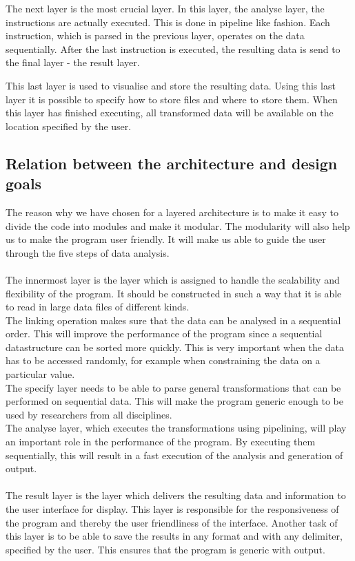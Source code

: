 \documentclass[a4paper,english,fleqn]{exam}
\begin{document}
The next layer is the most crucial layer. In this layer, the analyse layer, the instructions are actually executed. This is done in pipeline like fashion. Each instruction, which is parsed in the previous layer, operates on the data sequentially. After the last instruction is executed, the resulting data is send to the final layer - the result layer. 

This last layer is used to visualise and store the resulting data. Using this last layer it is possible to specify how to store files and where to store them. When this layer has finished executing, all transformed data will be available on the location specified by the user.

\subsection{Relation between the architecture and design goals}
The reason why we have chosen for a layered architecture is to make it easy to divide the code into modules and make it modular. The modularity will also help us to make the program user friendly. It will make us able to guide the user through the five steps of data analysis. \\ \\
The innermost layer is the layer which is assigned to handle the scalability and flexibility of the program. It should be constructed in such a way that it is able to read in large data files of different kinds. \\
The linking operation makes sure that the data can be analysed in a sequential order. This will improve the performance of the program since a sequential datastructure can be sorted more quickly. This is very important when the data has to be accessed randomly, for example when constraining the data on a particular value. 
\\
The specify layer needs to be able to parse general transformations that can be performed on sequential data. This will make the program generic enough to be used by researchers from all disciplines.
\\
The analyse layer, which executes the transformations using pipelining, will play an important role in the performance of the program. By executing them sequentially, this will result in a fast execution of the analysis and generation of output.
\\ 
\\
The result layer is the layer which delivers the resulting data and information to the user interface for display. This layer is responsible for the responsiveness of the program and thereby the user friendliness of the interface. Another task of this layer is to be able to save the results in any format and with any delimiter, specified by the user. This ensures that the program is generic with output. 
\end{document}
